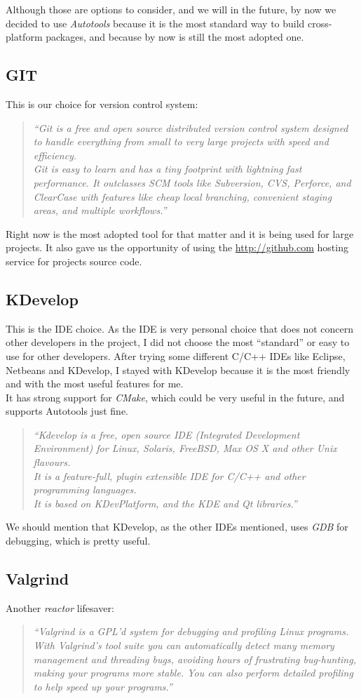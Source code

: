 Although those are options to consider, and we will in the future, by now we decided to use \emph{Autotools} because it is the most 
standard way to build cross-platform packages, and because by now is still the most adopted one.
\subsection{GIT}
This is our choice for version control system\cite{git}:
\begin{quote}
  \emph{``Git is a free and open source distributed version control system designed to handle everything from small to very large projects 
    with speed and efficiency.\\
    Git is easy to learn and has a tiny footprint with lightning fast performance. It outclasses SCM tools like Subversion, CVS, Perforce,
    and ClearCase with features like cheap local branching, convenient staging areas, and multiple workflows.''}
\end{quote}
Right now is the most adopted tool for that matter and it is being used for large projects. It also gave us the opportunity of using
the \url{http://github.com} hosting service for projects source code.
\subsection{KDevelop}
This is the IDE choice\cite{kdevelop}. As the IDE is very personal choice that does not concern other developers in the project, I did 
not choose the most ``standard'' or easy to use for other developers. After trying some different C/C++ IDEs like Eclipse, Netbeans and 
KDevelop, I stayed with KDevelop because it is the most friendly and with the most useful features for me.\\
It has strong support for \emph{CMake}, which could be very useful in the future, and supports Autotools just fine.
\begin{quote}
  \emph{``Kdevelop is a free, open source IDE (Integrated Development Environment) for Linux, Solaris, FreeBSD, Max OS X and other Unix 
    flavours.\\
    It is a feature-full, plugin extensible IDE for C/C++ and other programming languages.\\
    It is based on KDevPlatform, and the KDE and Qt libraries.''}
\end{quote}
We should mention that KDevelop, as the other IDEs mentioned, uses \emph{GDB} for debugging, which is pretty useful.
\subsection{Valgrind}
Another \emph{reactor} lifesaver\cite{valgrind}:
\begin{quote}
  \emph{``Valgrind is a GPL'd system for debugging and profiling Linux programs. With Valgrind's tool suite you can automatically detect 
    many memory management and threading bugs, avoiding hours of frustrating bug-hunting, making your programs more stable. You can also 
    perform detailed profiling to help speed up your programs.''}
\end{quote}
